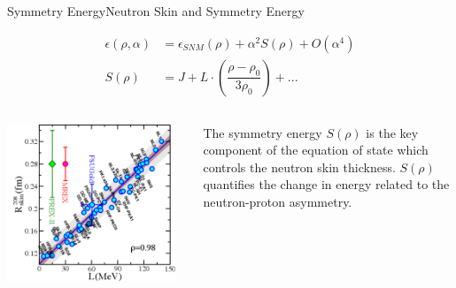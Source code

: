 \documentclass[9pt,a4paper]{beamer}
\begin{document}
\begin{frame}{Symmetry Energy}{Neutron Skin and Symmetry Energy}

\begin{equation}
\begin{split}
\epsilon(\rho, \alpha) &= \epsilon_{SNM}(\rho) + \alpha^{2} S(\rho) + O(\alpha^{4}) \\
S(\rho) &= J + L \cdot (\dfrac{\rho - \rho_{0}}{3 \rho_{0}}) + ...
\end{split}
\end{equation} 

\begin{columns}[T]
\begin{column}{0.5\textwidth}
\begin{center}
\includegraphics[width = 0.95\textwidth]{figures/LvsR1.pdf}
\end{center}
\end{column}
\begin{column}{0.5\textwidth}
 \medskip The symmetry energy $S(\rho)$ is the key component of the equation of state which controls the neutron skin thickness. $S(\rho)$ quantifies the change in energy related to the neutron-proton asymmetry. 
\end{column}
\end{columns}
\end{frame}
\end{document}
